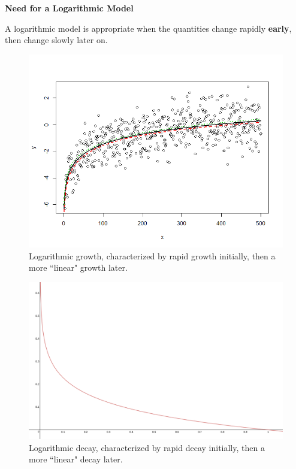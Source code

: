 \documentclass{ximera}
\begin{document}
\begin{theorem}
\textbf{Need for a Logarithmic Model}

A logarithmic model is appropriate when the quantities change rapidly \textbf{early}, then change slowly later on. 

\begin{figure}
	\includegraphics[scale=0.6]{logGrowth.png}
	\caption{Logarithmic growth, characterized by rapid growth initially, then a more ``linear" growth later.}
\end{figure}

\begin{figure}
	\includegraphics[scale=0.3]{logDecay.png}
	\caption{Logarithmic decay, characterized by rapid decay initially, then a more ``linear" decay later.}
\end{figure}

\end{theorem}
\end{document}

